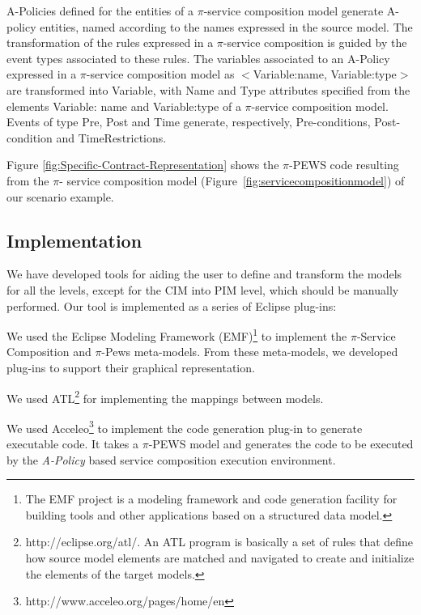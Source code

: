 \documentclass{singlecol-new}
\theoremstyle{TH}{
\newtheorem{lemma}{Lemma}
\newtheorem{theorem}[lemma]{Theorem}
\newtheorem{corrolary}[lemma]{Corrolary}
\newtheorem{conjecture}[lemma]{Conjecture}
\newtheorem{proposition}[lemma]{Proposition}
\newtheorem{claim}[lemma]{Claim}
\newtheorem{stheorem}[lemma]{Wrong Theorem}
\newtheorem{algorithm}{Algorithm}
}
\theoremstyle{THrm}{
\newtheorem{definition}{Definition}[section]
\newtheorem{question}{Question}[section]
\newtheorem{remark}{Remark}
\newtheorem{scheme}{Scheme}
}
\theoremstyle{THhit}{
\newtheorem{case}{Case}[section]
}
\theoremstyle{THhsl}{
\newtheorem{example}{Example}
}
\begin{document}
A-Policies defined for the entities of a $\pi$-service composition model generate {\sf A-policy} entities, named according to the names expres\-sed in the source model.
The transformation of the rules expres\-sed in a $\pi$-service composition is guided by the event types associated to these rules. 
The variables associated to an A-Policy expressed in a $\pi$-service composition model as {\sf $<$Variable:name, Variable:type$>$} are transformed into  {\sf Variable}, with  {\sf Name} and {\sf Type} attributes specified from the elements {\sf Variable: name} and {\sf Variable:type} of a $\pi$-service composition model.
%
Events of type {\sf Pre}, {\sf Post} and {\sf Time} generate, respectively, {\sf Pre-conditions}, {\sf Post-condition} and {\sf TimeRestrictions}.

\begin{example}\label{ex:toPublicMusicT6}
Figure \ref{fig:Specific-Contract-Representation} shows the $\pi$-PEWS code resulting from the $\pi$- service composition model (Figure~\ref{fig:servicecompositionmodel}) of our scenario example.
\end{example}


\subsection{Implementation}
We have developed tools for aiding the user to define and transform the models for all the levels, except for the CIM into PIM level, which should be manually performed.
Our tool is implemented as a series of Eclipse plug-ins: 
\begin{compactitem}
\item 	We  used the Eclipse Modeling Framework (EMF)\footnote{The EMF project is a modeling framework and code generation facility for building tools and other applications based on a structured data model.}   to implement the  $\pi$-Service Composition and $\pi$-{\sc Pews}  meta-models. 
From these meta-models, we  developed plug-ins to support their graphical representation.

\item	 We used  ATL\footnote{http://eclipse.org/atl/. An ATL program is basically a set of rules that define how source model elements are matched and navigated to create and initialize the elements of the target models.}
for implementing the  mappings between models.

\item 	We  used Acceleo\footnote{http://www.acceleo.org/pages/home/en} to implement  the code generation plug-in to generate executable code. 
It takes a $\pi$-PEWS model and generates the code to be executed by the {\em
A-Policy} based service composition execution environment.
\end{compactitem}
\end{document}

